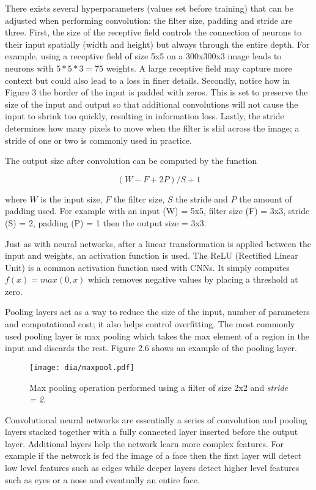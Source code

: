 \documentclass[12pt]{report}
\begin{document}
There exists several hyperparameters (values set before training) that can be adjusted when performing convolution: the  filter size, padding and stride are three. First, the size of the receptive field controls the connection of neurons to their input spatially (width and height) but always through the entire depth. For example, using a receptive field of size 5x5 on a 300x300x3 image leads to neurons with $5*5*3=75$ weights.  A large receptive field may capture more context but could also lead to a loss in finer details. Secondly, notice how in Figure 3 the border of the input is padded with zeros. This is set to preserve the size of the input and output so that additional convolutions will not cause the input to shrink too quickly, resulting in information loss.  Lastly, the stride determines how many pixels to move when the filter is slid across the image; a stride of one or two is commonly used in practice.

The output size after convolution can be computed by the function

\begin{equation}
(W - F + 2P) / S + 1
\end{equation}

where $W$ is the input size, $F$ the filter size, $S$ the stride and $P$ the amount of padding used. For example with an input (W) = 5x5, filter size (F) = 3x3, stride (S) = 2, padding (P) = 1 then the output size = 3x3.  

Just as with neural networks, after a linear transformation is applied between the input and weights, an activation function is used. The ReLU (Rectified Linear Unit) \cite{relu} is a common activation function used with CNNs. It simply computes $f(x) = max(0,x)$ which removes negative values by placing a threshold at zero.  

Pooling layers act as a way to reduce the size of the input, number of parameters and computational cost; it also helps control overfitting. The most commonly used pooling layer is max pooling which takes the max element of a region in the input and discards the rest. Figure 2.6 shows an example of the pooling layer.

\begin{figure}[H]
\centering
\texttt{[image: dia/maxpool.pdf]}
\caption[Max pooling] {Max pooling operation performed using a filter of size 2x2 and \textit{stride = 2}.}
\end{figure}

Convolutional neural networks are essentially a series of convolution and pooling layers stacked together with a fully connected layer inserted before the output layer. Additional layers help the network learn more complex features. For example if the network is fed the image of a face then the first layer will detect low level features such as edges while deeper layers detect higher level features such as eyes or a nose and eventually an entire face.
\end{document}
